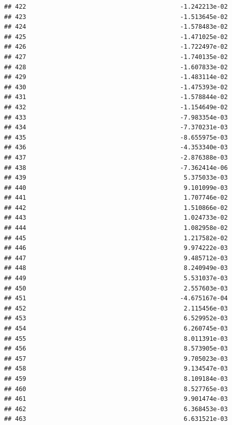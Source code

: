 \documentclass[
]{article}
\begin{document}
\begin{verbatim}
## 422                                          -1.242213e-02
## 423                                          -1.513645e-02
## 424                                          -1.578483e-02
## 425                                          -1.471025e-02
## 426                                          -1.722497e-02
## 427                                          -1.740135e-02
## 428                                          -1.607833e-02
## 429                                          -1.483114e-02
## 430                                          -1.475393e-02
## 431                                          -1.578844e-02
## 432                                          -1.154649e-02
## 433                                          -7.983354e-03
## 434                                          -7.370231e-03
## 435                                          -8.655975e-03
## 436                                          -4.353340e-03
## 437                                          -2.876388e-03
## 438                                          -7.362414e-06
## 439                                           5.375033e-03
## 440                                           9.101099e-03
## 441                                           1.707746e-02
## 442                                           1.510866e-02
## 443                                           1.024733e-02
## 444                                           1.082958e-02
## 445                                           1.217582e-02
## 446                                           9.974222e-03
## 447                                           9.485712e-03
## 448                                           8.240949e-03
## 449                                           5.531037e-03
## 450                                           2.557603e-03
## 451                                          -4.675167e-04
## 452                                           2.115456e-03
## 453                                           6.529952e-03
## 454                                           6.260745e-03
## 455                                           8.011391e-03
## 456                                           8.573905e-03
## 457                                           9.705023e-03
## 458                                           9.134547e-03
## 459                                           8.109184e-03
## 460                                           8.527765e-03
## 461                                           9.901474e-03
## 462                                           6.368453e-03
## 463                                           6.631521e-03

\end{verbatim}
\end{document}
